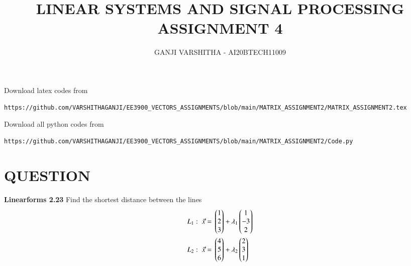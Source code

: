 \documentclass[journal,12pt,twocolumn]{IEEEtran}
\begin{document}
\let\vec\mathbf
\renewcommand{\thefigure}{\theproblem}
\def\putbox#1#2#3{\makebox[0in][l]{\makebox[#1][l]{}\raisebox{\baselineskip}[0in][0in]{\raisebox{#2}[0in][0in]{#3}}}}
     \def\rightbox#1{\makebox[0in][r]{#1}}
     \def\centbox#1{\makebox[0in]{#1}}
     \def\topbox#1{\raisebox{-\baselineskip}[0in][0in]{#1}}
     \def\midbox#1{\raisebox{-0.5\baselineskip}[0in][0in]{#1}}
\vspace{3cm}
\title{\textbf{LINEAR SYSTEMS AND SIGNAL PROCESSING \\ ASSIGNMENT 4}}
\author{GANJI VARSHITHA - AI20BTECH11009}
\maketitle
\newpage
\bigskip
\renewcommand{\thefigure}{\arabic{figure}}
\renewcommand{\thetable}{\arabic{table}}
Download latex codes from 
%
\begin{lstlisting}
https://github.com/VARSHITHAGANJI/EE3900_VECTORS_ASSIGNMENTS/blob/main/MATRIX_ASSIGNMENT2/MATRIX_ASSIGNMENT2.tex
\end{lstlisting}
Download all python codes from
\begin{lstlisting}
https://github.com/VARSHITHAGANJI/EE3900_VECTORS_ASSIGNMENTS/blob/main/MATRIX_ASSIGNMENT2/Code.py
\end{lstlisting}
\section*{QUESTION}
\textbf{Linearforms 2.23}
 Find the shortest distance between the lines
\begin{align}
\label{eq:1}
 L_{1}: \; \Vec{x} ={}& \begin{pmatrix}1 \\ 2\\ 3 \end{pmatrix} +\lambda_{1}\begin{pmatrix}1 \\ -3 \\ 2\end{pmatrix}\\
 \label{eq:2}
 L_{2}: \; \Vec{x} ={}& \begin{pmatrix}4 \\ 5\\ 6\end{pmatrix} + \lambda_{2}\begin{pmatrix}2 \\ 3 \\ 1\end{pmatrix} 
\end{align}
\end{document}

